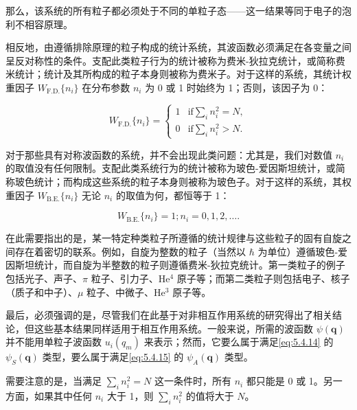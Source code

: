 那么，该系统的所有粒子都必须处于不同的单粒子态------这一结果等同于电子的泡利不相容原理。

相反地，由遵循排除原理的粒子构成的统计系统，其波函数必须满足在各变量之间呈反对称性的条件。支配此类粒子行为的统计被称为费米-狄拉克统计，或简称费米统计；统计及其所构成的粒子本身则被称为费米子。对于这样的系统，其统计权重因子 \(W_{\text{F.D.}}\{n_{i}\}\) 在分布参数 \(n_{i}\) 为 0 或 1 时始终为 1；否则，该因子为 0：

\begin{equation}\tag{5.4.19}\label{eq:5.4.19}
W _ { \mathrm { F . D . } } \{ n _ { i } \} = \left\{ \begin{array}{ll} { 1 } & { \mathrm { i f }  \sum _ { i } n _ { i } ^{2} = N , } \\{ 0 } & { \mathrm { i f }  \sum _ { i } n _ { i } ^{2} > N . } \end{array} \right.
\end{equation}

对于那些具有对称波函数的系统，并不会出现此类问题：尤其是，我们对数值 \(n_i\) 的取值没有任何限制。支配此类系统行为的统计被称为玻色-爱因斯坦统计，或简称玻色统计；而构成这些系统的粒子本身则被称为玻色子。对于这样的系统，其权重因子 \(W_{\text{B.E.}}\{n_i\}\) 无论 \(n_i\) 的取值为何，都恒等于 1：

\begin{equation}\tag{5.4.20}\label{eq:5.4.20}
W _ { \mathrm { B . E . } } \{ n _ { i } \} = 1 ;  n _ { i } = 0 , 1 , 2 , \ldots .
\end{equation}

在此需要指出的是，某一特定种类粒子所遵循的统计规律与这些粒子的固有自旋之间存在着密切的联系。例如，自旋为整数的粒子（当然以 \(\hbar\) 为单位）遵循玻色-爱因斯坦统计，而自旋为半整数的粒子则遵循费米-狄拉克统计。第一类粒子的例子包括光子、声子、\(\pi\) 粒子、引力子、He\(^{4}\) 原子等；而第二类粒子则包括电子、核子（质子和中子）、\(\mu\) 粒子、中微子、He\(^{3}\) 原子等。

最后，必须强调的是，尽管我们在此基于对非相互作用系统的研究得出了相关结论，但这些基本结果同样适用于相互作用系统。一般来说，所需的波函数 \(\psi(\boldsymbol{q})\) 并不能用单粒子波函数 \(u_{i}(q_{m})\) 来表示；然而，它要么属于满足\autoref{eq:5.4.14} 的 \(\psi_{S}(\boldsymbol{q})\) 类型，要么属于满足\autoref{eq:5.4.15} 的 \(\psi_{A}(\boldsymbol{q})\) 类型。

需要注意的是，当满足 \(\sum_{i}n_{i}^{2}=N\) 这一条件时，所有 \(n_{i}\) 都只能是 0 或 1。另一方面，如果其中任何 \(n_{i}\) 大于 1，则 \(\sum_{i}n_{i}^{2}\) 的值将大于 \(N\)。


